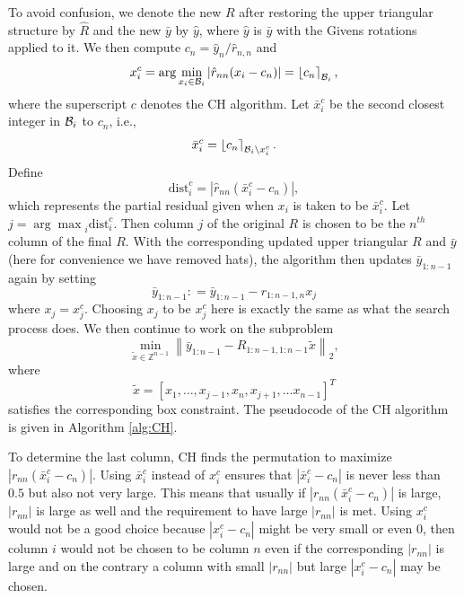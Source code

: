 \documentclass[12pt,Bold,letterpaper]{mcgilletdclass}
\newcommand{\be}{\begin{equation}}
\newcommand{\ee}{\end{equation}}
\newcommand{\dist}{\mathrm{dist}}
\begin{document}
To avoid confusion, we denote the new $R$ after restoring the upper triangular structure by $\hat{R}$ and the new $\bar{y}$ by $\hat{y}$, where $\hat{y}$ is $\bar{y}$ with the Givens rotations applied to it.
We then compute  $c_n=\hat{y}_n/\hat{r}_{n,n}$ and 
\be
x_i^c=\arg\min_{x_i\in {\cal B}_i}\left |\hat{r}_{nn}(x_i- c_n) \right | = \left \lfloor c_n \right \rceil_{{\cal B}_i},
\label{eq:xic}
\ee
where the superscript $c$ denotes the CH algorithm. 
Let $\bar{x}_i^c$ be the second closest integer in ${{\cal B}_i}$ to $c_n$,
i.e.,  
$$\bar{x}_i^c= \left \lfloor c_n \right \rceil_{{\cal B}_i\backslash x_i^c}.$$
Define
\be
\dist_i^c = |\hat{r}_{nn}( \bar{x}_i^c -c_n) |, 
\label{eq:dic}
\ee
which represents the partial residual given when $x_i$ is taken to be $\bar{x}_i^c$.
Let $j = {\arg\max}_i \dist_i^c$.
Then  column $j$ of the original $R$ is chosen to be the $n^{th}$ column of the final $R$.
With the corresponding updated upper triangular $R$ and $\bar{y}$
(here for convenience we have removed hats),
the algorithm then updates  $\bar{y}_{1:n-1}$ again
by setting $$\bar{y}_{1:n-1}: = \bar{y}_{1:n-1} - r_{1:n-1,n}x_j$$ where $x_j=x_j^c$. 
Choosing  $x_j$ to be  $x_j^c$ here is exactly the same as what the search process does.
We then continue to work on the subproblem 
\be
\min_{\tilde{x}\in \mathbb{Z}^{n-1}} \left \| \bar{y}_{1:n-1}-R_{1:n-1,1:n-1}\tilde{x} \right \|_2,
\label{eq:subc}
\ee
where $$\tilde{x}=[x_1,\ldots, x_{j-1}, x_n, x_{j+1}, \ldots x_{n-1}]^T$$ satisfies the corresponding box constraint.
The pseudocode of the CH algorithm is given in Algorithm \ref{alg:CH}.

To determine the last column, CH finds the permutation to 
maximize $\left |r_{nn}(\bar{x}_i^c-c_n) \right |$. Using $\bar{x}_i^c$ instead of $x_i^c$
ensures that $\left | \bar{x}_i^c-c_n \right |$ is never less than $0.5$ but
also not very large. This means that usually if $\left | r_{nn}(\bar{x}_i^c-c_n)
\right |$ is large, $\left | r_{nn} \right |$ is large as well and the
requirement to have large $|r_{nn}|$ %
is met.
Using $x_i^c$ would not be a good choice because $\left | x_i^c - c_n \right |$ might be 
very small or even $0$, then column $i$ would not be chosen to be column $n$
even if the corresponding $|r_{nn}|$ is large and on the contrary a column with small $|r_{nn}|$
but large $|x_i^c-c_n|$ may be chosen.
\end{document}
